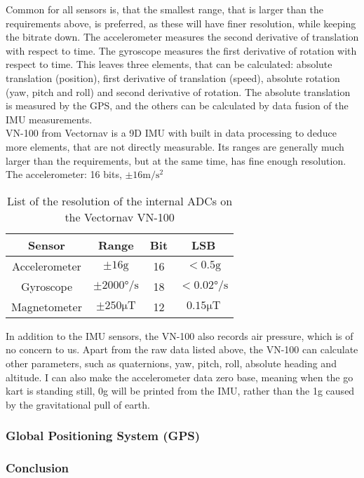 Common for all sensors is, that the smallest range, that is larger than the requirements above, is preferred, as these will have finer resolution, while keeping the bitrate down.
The accelerometer measures the second derivative of translation with respect to time. 
The gyroscope measures the first derivative of rotation with respect to time.
This leaves three elements, that can be calculated: absolute translation (position), first derivative of translation (speed), absolute rotation (yaw, pitch and roll) and second derivative of rotation.
The absolute translation is measured by the GPS, and the others can be calculated by data fusion of the IMU measurements.\\

VN-100 from Vectornav is a 9D IMU with built in data processing to deduce more elements, that are not directly measurable.
Its ranges are generally much larger than the requirements, but at the same time, has fine enough resolution.
The accelerometer: 16 bits,  $\pm 16 \si{\meter \per \second \squared}$

\begin{table}
	\centering
	\begin{tabular}{ c | c c c}
		{\textbf{Sensor}} & {\textbf{Range}} & {\textbf{Bit}} & {\textbf{LSB}}\\
		\hline
		{Accelerometer}	& { $\pm 16 \mathrm{g}$}					& {16}	& {$< 0.5 \mathrm{g}$}\\
		{Gyroscope}		& { $\pm 2000\si{\degree \per \second}$ }	& {18}	& {$<0.02 \si{\degree \per \second}$}\\
		{Magnetometer}	& { $\pm 250 \si{\micro \tesla}$}			& {12}	& {$0.15 \si{\micro \tesla}$}
	\end{tabular}
	\caption{List of the resolution of the internal ADCs on the Vectornav VN-100}
	\label{tab:vectornav_measurement_resolution}
\end{table}

In addition to the IMU sensors, the VN-100 also records air pressure, which is of no concern to us.
Apart from the raw data listed above, the VN-100 can calculate other parameters, such as quaternions, yaw, pitch, roll, absolute heading and altitude.
I can also make the accelerometer data zero base, meaning when the go kart is standing still, 0g will be printed from the IMU, rather than the 1g caused by the gravitational pull of earth. 

\subsubsection*{Global Positioning System (GPS)}


\subsubsection*{Conclusion}
